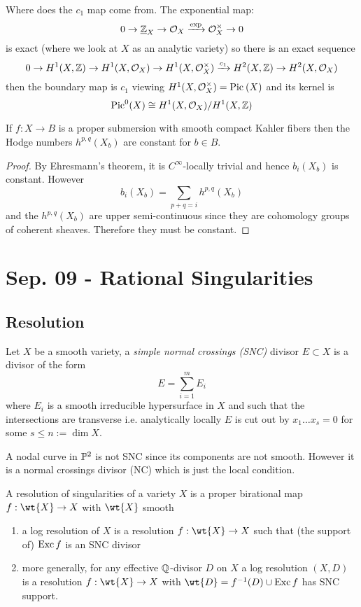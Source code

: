 \documentclass[12pt]{article}
\begin{document}
Where does the $c_1$ map come from. The exponential map:
\[ 0 \to \ul{\Z}_X \to \struct{X} \xrightarrow{\exp} \struct{X}^\times \to 0 \]
is exact (where we look at $X$ as an analytic variety) so there is an exact sequence
\[ 0 \to H^1(X, \Z) \to H^1(X, \struct{X}) \to H^1(X, \struct{X}^\times) \xrightarrow{c_1} H^2(X, \Z) \to H^2(X, \struct{X}) \]
then the boundary map is $c_1$ viewing $H^1(X, \struct{X}^\times) = \Pic{X}$ and its kernel is
\[ \mathrm{Pic}^0(X) \cong H^1(X, \struct{X}) / H^1(X, \Z) \] 
 

\begin{theorem}
If $f : X \to B$ is a proper submersion with smooth compact Kahler fibers then the Hodge numbers $h^{p,q}(X_b)$ are constant for $b \in B$. 
\end{theorem}

\begin{proof}
By Ehresmann's theorem, it is $C^\infty$-locally trivial and hence $b_i(X_b)$ is constant. However
\[ b_i(X_b) = \sum_{p+q = i} h^{p,q}(X_b) \]
and the $h^{p,q}(X_b)$ are upper semi-continuous since they are cohomology groups of coherent sheaves. Therefore they must be constant. 
\end{proof}
 
 
 
 
\section{Sep. 09 - Rational Singularities}

\subsection{Resolution}

\begin{defn}
Let $X$ be a smooth variety, a \textit{simple normal crossings (SNC)} divisor $E \subset X$ is a divisor of the form
\[ E = \sum_{i = 1}^m E_i \]
where $E_i$ is a smooth irreducible hypersurface in $X$ and such that the intersections are transverse i.e. analytically locally $E$ is cut out by $x_1 \dots x_s = 0$ for some $s \le n := \dim{X}$.
\end{defn} 

\begin{example}
A nodal curve in $\P^2$ is not SNC since its components are not smooth. However it is a normal crossings divisor (NC) which is just the local condition. 
\end{example}
 
 
\begin{defn}
A resolution of singularities of a variety $X$ is a proper birational map $f : \wt{X} \to X$ with $\wt{X}$ smooth 
\begin{enumerate}
\item a log resolution of $X$ is a resolution $f : \wt{X} \to X$ such that (the support of) $\Exc{f}$ is an SNC divisor 
\item more generally, for any effective $\Q$-divisor $D$ on $X$ a log resolution $(X, D)$ is a resolution $f : \wt{X} \to X$ with $\wt{D} = f^{-1}(D) \cup \Exc{f}$ has SNC support.
\end{enumerate}
\end{defn}
\end{document}
